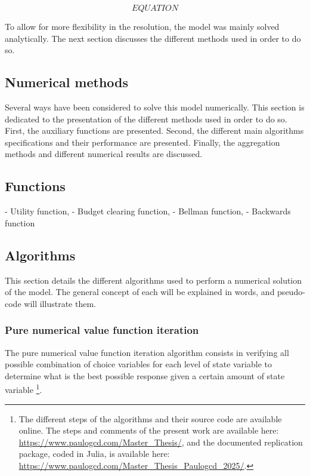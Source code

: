 \documentclass{article}
\begin{document}
$$EQUATION$$

To allow for more flexibility in the resolution, the model was mainly solved
analytically. The next section discusses the different methods used in order to do so.

\subsection{Numerical methods}

Several ways have been considered to solve this model numerically. 
This section is dedicated to the presentation of the different methods
used in order to do so. 
First, the auxiliary functions are presented. 
Second, the different main algorithms specifications and their performance are presented. 
Finally, the aggregation methods and different numerical results are discussed.

\subsection{Functions}

- Utility function, 
- Budget clearing function, 
- Bellman function, 
- Backwards function

\subsection{Algorithms}

This section details the different algorithms used to perform a numerical 
solution of the model. 
The general concept of each will be explained in words, and 
pseudo-code will illustrate them.

\subsubsection{Pure numerical value function iteration}

The pure numerical value function iteration algorithm consists
in verifying all possible 
combination of choice variables for each level of state variable 
to determine what is the best possible response given a certain
amount of state variable \footnote{The different steps of the algorithms and their source code are available online.
The steps and comments of the present work are available here: \url{https://www.paulogcd.com/Master_Thesis/},
and the documented replication package, coded in Julia, is available here: \url{https://www.paulogcd.com/Master_Thesis_Paulogcd_2025/}.}.
\end{document}

